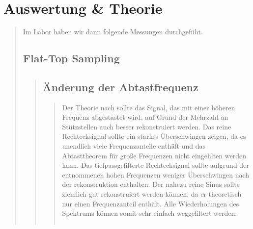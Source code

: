 \section{Auswertung \& Theorie}
\begin{quote}
    
    Im Labor haben wir dann folgende Messungen durchgefüht.
    
    
    \subsection{Flat-Top Sampling}
    \begin{quote}
        
        \subsection{Änderung der Abtastfrequenz}
        \begin{quote}
            
            Der Theorie nach sollte das Signal, das mit einer höheren Frequenz abgestastet wird, auf Grund der Mehrzahl
            an Stützstellen auch besser rekonstruiert werden.
            Das reine Rechtecksignal sollte ein starkes Überschwingen zeigen, da es unendlich viele Frequenzanteile
            enthält und das Abtasttheorem für große Frequenzen nicht eingehlten werden kann.
            Das tiefpassgefilterte Rechtecksignal sollte aufgrund der entnommenen hohen Frequenzen weniger Überschwingen
            nach der rekonstruktion enthalten.
            Der nahezu reine Sinus sollte ziemlich gut rekonstruiert werden können, da er theoretisch nur einen
            Frequenzanteil enthält. Alle Wiederholungen des Spektrums können somit sehr einfach weggefiltert werden.
            
            
            \begin{center}
            \begin{tabular}{ll}
            

\end{tabular}
\end{center}
\end{quote}
\end{quote}
\end{quote}
